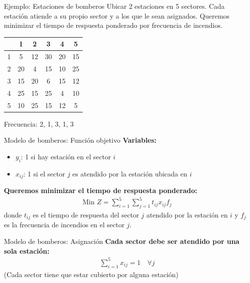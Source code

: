\documentclass{beamer}
\begin{document}
\begin{frame}{Ejemplo: Estaciones de bomberos}
    Ubicar 2 estaciones en 5 sectores. Cada estación atiende a su propio sector y a los que le sean asignados. Queremos minimizar el tiempo de respuesta ponderado por frecuencia de incendios.
    \begin{table}[H]
        \centering
        \begin{tabular}{c|ccccc}
            \toprule
            & 1 & 2 & 3 & 4 & 5 \\
            \midrule
            1 & 5 & 12 & 30 & 20 & 15 \\
            2 & 20 & 4 & 15 & 10 & 25 \\
            3 & 15 & 20 & 6 & 15 & 12 \\
            4 & 25 & 15 & 25 & 4 & 10 \\
            5 & 10 & 25 & 15 & 12 & 5 \\
            \bottomrule
        \end{tabular}
    \end{table}
    Frecuencia: 2, 1, 3, 1, 3
\end{frame}

\begin{frame}{Modelo de bomberos: Función objetivo}
    \textbf{Variables:}
    \begin{itemize}
        \item $y_i$: 1 si hay estación en el sector $i$
        \item $x_{ij}$: 1 si el sector $j$ es atendido por la estación ubicada en $i$
    \end{itemize}
    \textbf{Queremos minimizar el tiempo de respuesta ponderado:}
    \begin{align*}
        \text{Min } Z = \sum_{i=1}^{5} \sum_{j=1}^{5} t_{ij} x_{ij} f_j
    \end{align*}
    donde $t_{ij}$ es el tiempo de respuesta del sector $j$ atendido por la estación en $i$ y $f_j$ es la frecuencia de incendios en el sector $j$.
\end{frame}

\begin{frame}{Modelo de bomberos: Asignación}
    \textbf{Cada sector debe ser atendido por una sola estación:}
    \begin{align*}
        \sum_{i=1}^{5} x_{ij} = 1 \quad \forall j
    \end{align*}
    (Cada sector tiene que estar cubierto por alguna estación)
\end{frame}
\end{document}
